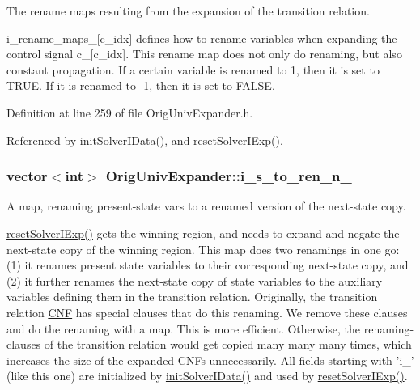The rename maps resulting from the expansion of the transition relation. 

i\-\_\-rename\-\_\-maps\-\_\-\mbox{[}c\-\_\-idx\mbox{]} defines how to rename variables when expanding the control signal c\-\_\-\mbox{[}c\-\_\-idx\mbox{]}. This rename map does not only do renaming, but also constant propagation. If a certain variable is renamed to 1, then it is set to T\-R\-U\-E. If it is renamed to -\/1, then it is set to F\-A\-L\-S\-E. 

Definition at line 259 of file Orig\-Univ\-Expander.\-h.



Referenced by init\-Solver\-I\-Data(), and reset\-Solver\-I\-Exp().

\hypertarget{classOrigUnivExpander_a03a45566b24c00386d7530f4b212b42d}{
\subsubsection[{i\-\_\-s\-\_\-to\-\_\-ren\-\_\-n\-\_\-}]{\setlength{\rightskip}{0pt plus 5cm}vector$<$int$>$ Orig\-Univ\-Expander\-::i\-\_\-s\-\_\-to\-\_\-ren\-\_\-n\-\_\-\hspace{0.3cm}{\ttfamily [protected]}}}\label{classOrigUnivExpander_a03a45566b24c00386d7530f4b212b42d}


A map, renaming present-\/state vars to a renamed version of the next-\/state copy. 

\hyperlink{classOrigUnivExpander_abcd12e41626b01f53ac7b8c654fa9218}{reset\-Solver\-I\-Exp()} gets the winning region, and needs to expand and negate the next-\/state copy of the winning region. This map does two renamings in one go\-: (1) it renames present state variables to their corresponding next-\/state copy, and (2) it further renames the next-\/state copy of state variables to the auxiliary variables defining them in the transition relation. Originally, the transition relation \hyperlink{classCNF}{C\-N\-F} has special clauses that do this renaming. We remove these clauses and do the renaming with a map. This is more efficient. Otherwise, the renaming-\/clauses of the transition relation would get copied many many many times, which increases the size of the expanded C\-N\-Fs unnecessarily. All fields starting with 'i\-\_\-' (like this one) are initialized by \hyperlink{classOrigUnivExpander_a1ca430c08a9927733951149db492916e}{init\-Solver\-I\-Data()} and used by \hyperlink{classOrigUnivExpander_abcd12e41626b01f53ac7b8c654fa9218}{reset\-Solver\-I\-Exp()}. 


